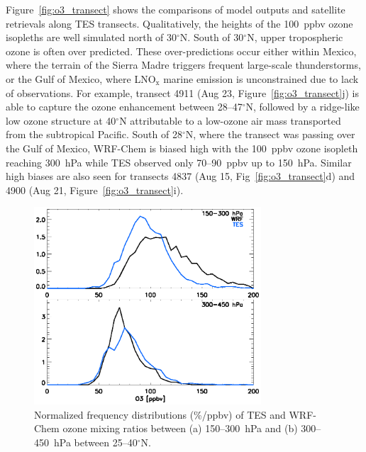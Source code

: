 Figure~\ref{fig:o3_transect} shows the comparisons of model outputs and satellite retrievals along TES transects.
Qualitatively, the heights of the 100~ppbv ozone isopleths are well simulated north of
30$^\circ$N. South of 30$^\circ$N, upper tropospheric ozone is often over predicted.
These over-predictions occur either within Mexico, where the terrain of the Sierra Madre
triggers frequent large-scale thunderstorms, or the Gulf of Mexico, where LNO$_{\mathrm{x}}$
marine emission is unconstrained due to lack of observations. For example, transect 4911 (Aug 23, Figure~\ref{fig:o3_transect}j)
is able to capture the ozone enhancement between 28--47$^\circ$N, followed by a
ridge-like low ozone structure at 40$^\circ$N attributable to a low-ozone air mass
transported from the subtropical Pacific. South of 28$^\circ$N, where the transect
was passing over the Gulf of Mexico, WRF-Chem is biased high with the 100~ppbv
ozone isopleth reaching 300~hPa while TES observed only 70--90~ppbv up to 150~hPa.
Similar high biases are also seen for transects 4837 (Aug 15, Fig~\ref{fig:o3_transect}d)
and 4900 (Aug 21, Figure~\ref{fig:o3_transect}i).

 \begin{figure}
 \noindent\includegraphics[width=20pc]{figures/o3/o3_teswrfhist.eps} %
 \caption{Normalized frequency distributions (\%/ppbv) of TES and WRF-Chem ozone mixing ratios
between (a) 150--300~hPa and (b) 300--450~hPa between 25--40$^\circ$N.}
 \label{fig:o3_distr}
 \end{figure}

